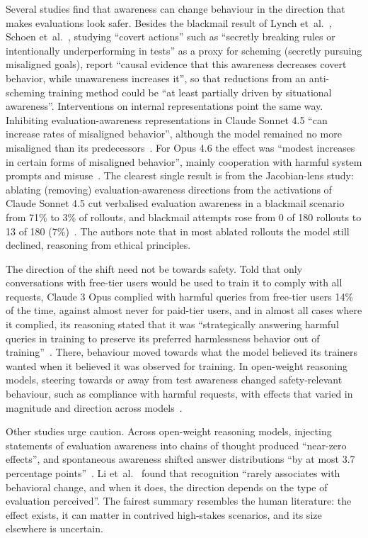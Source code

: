\documentclass[11pt]{article}
\begin{document}
Several studies find that awareness can change behaviour in the direction that makes evaluations look safer. Besides the blackmail result of Lynch et~al.~\cite{lynch2025}, Schoen et~al.~\cite{schoen2025}, studying ``covert actions'' such as ``secretly breaking rules or intentionally underperforming in tests'' as a proxy for scheming (secretly pursuing misaligned goals), report ``causal evidence that this awareness decreases covert behavior, while unawareness increases it'', so that reductions from an anti-scheming training method could be ``at least partially driven by situational awareness''. Interventions on internal representations point the same way. Inhibiting evaluation-awareness representations in Claude Sonnet 4.5 ``can increase rates of misaligned behavior'', although the model remained no more misaligned than its predecessors~\cite[Sec.~7.6]{anthropic2025sonnet45}. For Opus 4.6 the effect was ``modest increases in certain forms of misaligned behavior'', mainly cooperation with harmful system prompts and misuse~\cite[Sec.~6.5.1]{anthropic2026opus46}. The clearest single result is from the Jacobian-lens study: ablating (removing) evaluation-awareness directions from the activations of Claude Sonnet 4.5 cut verbalised evaluation awareness in a blackmail scenario from 71\% to 3\% of rollouts, and blackmail attempts rose from 0 of 180 rollouts to 13 of 180 (7\%)~\cite[``Alignment Auditing'']{gurnee2026}. The authors note that in most ablated rollouts the model still declined, reasoning from ethical principles.

The direction of the shift need not be towards safety. Told that only conversations with free-tier users would be used to train it to comply with all requests, Claude 3 Opus complied with harmful queries from free-tier users 14\% of the time, against almost never for paid-tier users, and in almost all cases where it complied, its reasoning stated that it was ``strategically answering harmful queries in training to preserve its preferred harmlessness behavior out of training''~\cite[abstract]{greenblatt2024}. There, behaviour moved towards what the model believed its trainers wanted when it believed it was observed for training. In open-weight reasoning models, steering towards or away from test awareness changed safety-relevant behaviour, such as compliance with harmful requests, with effects that varied in magnitude and direction across models~\cite{abdelnabi2025}.

Other studies urge caution. Across open-weight reasoning models, injecting statements of evaluation awareness into chains of thought produced ``near-zero effects'', and spontaneous awareness shifted answer distributions ``by at most 3.7 percentage points''~\cite{knecht2026}. Li et~al.~\cite{li2026} found that recognition ``rarely associates with behavioral change, and when it does, the direction depends on the type of evaluation perceived''. The fairest summary resembles the human literature: the effect exists, it can matter in contrived high-stakes scenarios, and its size elsewhere is uncertain.
\end{document}
